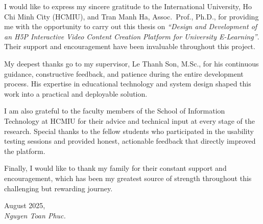 I would like to express my sincere gratitude to the International University, Ho Chi Minh City
(HCMIU), and Tran Manh Ha, Assoc.\ Prof., Ph.D., for providing me with the opportunity to
carry out this thesis on \textit{``Design and Development of an H5P Interactive Video Content
Creation Platform for University E-Learning''}. Their support and encouragement have
been invaluable throughout this project.

My deepest thanks go to my supervisor, Le Thanh Son, M.Sc., for his continuous guidance,
constructive feedback, and patience during the entire development process. His expertise in
educational technology and system design shaped this work into a practical and deployable
solution.

I am also grateful to the faculty members of the School of Information Technology at HCMIU
for their advice and technical input at every stage of the research. Special thanks to the
fellow students who participated in the usability testing sessions and provided honest,
actionable feedback that directly improved the platform.

Finally, I would like to thank my family for their constant support and encouragement, which
has been my greatest source of strength throughout this challenging but rewarding journey.

\bigskip
\noindent
August 2025, \\
\textit{Nguyen Toan Phuc.}
